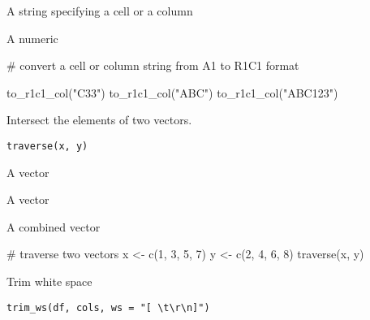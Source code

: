 \documentclass[letterpaper]{book}
\begin{document}
%
\begin{Arguments}
\begin{ldescription}
\item[\code{x}] A string specifying a cell or a column
\end{ldescription}
\end{Arguments}
%
\begin{Value}
A numeric
\end{Value}
%
\begin{Examples}
\begin{ExampleCode}
# convert a cell or column string from A1 to R1C1 format

to_r1c1_col("C33")
to_r1c1_col("ABC")
to_r1c1_col("ABC123")

\end{ExampleCode}
\end{Examples}
%
\begin{Description}
Intersect the elements of two vectors.
\end{Description}
%
\begin{Usage}
\begin{verbatim}
traverse(x, y)
\end{verbatim}
\end{Usage}
%
\begin{Arguments}
\begin{ldescription}
\item[\code{x}] A vector

\item[\code{y}] A vector
\end{ldescription}
\end{Arguments}
%
\begin{Value}
A combined vector
\end{Value}
%
\begin{Examples}
\begin{ExampleCode}
# traverse two vectors
x <- c(1, 3, 5, 7)
y <- c(2, 4, 6, 8)
traverse(x, y)

\end{ExampleCode}
\end{Examples}
%
\begin{Description}
Trim white space
\end{Description}
%
\begin{Usage}
\begin{verbatim}
trim_ws(df, cols, ws = "[ \t\r\n]")
\end{verbatim}
\end{Usage}
\end{document}
